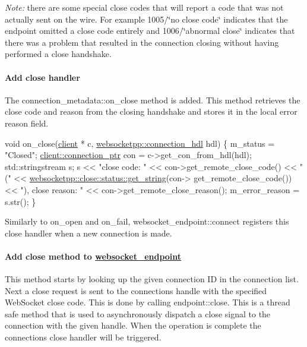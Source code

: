 {\itshape Note\+:} there are some special close codes that will report a code that was not actually sent on the wire. For example 1005/\char`\"{}no close code\char`\"{} indicates that the endpoint omitted a close code entirely and 1006/\char`\"{}abnormal close\char`\"{} indicates that there was a problem that resulted in the connection closing without having performed a close handshake.

\paragraph*{Add close handler}

The {\ttfamily connection\+\_\+metadata\+::on\+\_\+close} method is added. This method retrieves the close code and reason from the closing handshake and stores it in the local error reason field.


\begin{DoxyCode}
\textcolor{keywordtype}{void} on\_close(\mbox{\hyperlink{classwebsocketpp_1_1client}{client}} * c, \mbox{\hyperlink{namespacewebsocketpp_a6b3d26a10ee7229b84b776786332631d}{websocketpp::connection\_hdl}} hdl) \{
    m\_status = \textcolor{stringliteral}{"Closed"};
    \mbox{\hyperlink{classwebsocketpp_1_1client_a2e187bbb2beac676bbfbc2e8065de83e}{client::connection\_ptr}} con = c->get\_con\_from\_hdl(hdl);
    std::stringstream s;
    s << \textcolor{stringliteral}{"close code: "} << con->get\_remote\_close\_code() << \textcolor{stringliteral}{" ("} 
      << \mbox{\hyperlink{namespacewebsocketpp_1_1close_1_1status_a4bf4987c79165b134ed1207a567ce209}{websocketpp::close::status::get\_string}}(con->
      get\_remote\_close\_code()) 
      << \textcolor{stringliteral}{"), close reason: "} << con->get\_remote\_close\_reason();
    m\_error\_reason = s.str();
\}
\end{DoxyCode}


Similarly to {\ttfamily on\+\_\+open} and {\ttfamily on\+\_\+fail}, {\ttfamily websocket\+\_\+endpoint\+::connect} registers this close handler when a new connection is made.

\paragraph*{Add close method to {\ttfamily \mbox{\hyperlink{classwebsocket__endpoint}{websocket\+\_\+endpoint}}}}

This method starts by looking up the given connection ID in the connection list. Next a close request is sent to the connection\textquotesingle{}s handle with the specified Web\+Socket close code. This is done by calling {\ttfamily endpoint\+::close}. This is a thread safe method that is used to asynchronously dispatch a close signal to the connection with the given handle. When the operation is complete the connection\textquotesingle{}s close handler will be triggered.


